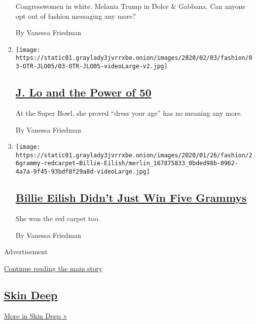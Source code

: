 \begin{enumerate}
  Congresswomen in white. Melania Trump in Dolce \& Gabbana. Can anyone
  opt out of fashion messaging any more?

  By Vanessa Friedman
\item
  \texttt{[image: https://static01.graylady3jvrrxbe.onion/images/2020/02/03/fashion/03-OTR-JLO05/03-OTR-JLO05-videoLarge-v2.jpg]}

  \hypertarget{j-lo-and-the-power-of-50}{%
  \subsection{\texorpdfstring{\href{/2020/02/03/style/jennifer-lopez-super-bowl.html}{J.
  Lo and the Power of
  50}}{J. Lo and the Power of 50}}\label{j-lo-and-the-power-of-50}}

  At the Super Bowl, she proved ``dress your age'' has no meaning any
  more.

  By Vanessa Friedman
\item
  \texttt{[image: https://static01.graylady3jvrrxbe.onion/images/2020/01/26/fashion/26grammy-redcarpet--Billie-Eilish/merlin\_167875833\_0bded98b-0962-4a7a-9f45-93bdf8f29a8d-videoLarge.jpg]}

  \hypertarget{billie-eilish-didnt-just-win-five-grammys}{%
  \subsection{\texorpdfstring{\href{/2020/01/27/fashion/billie-eilish-grammys.html}{Billie
  Eilish Didn't Just Win Five
  Grammys}}{Billie Eilish Didn't Just Win Five Grammys}}\label{billie-eilish-didnt-just-win-five-grammys}}

  She won the red carpet too.

  By Vanessa Friedman
\end{enumerate}

Advertisement

\protect\hyperlink{after-mid5}{Continue reading the main story}

\hypertarget{skin-deep}{%
\subsection{\texorpdfstring{\href{/column/skin-deep}{Skin
Deep}}{Skin Deep}}\label{skin-deep}}

\href{/column/skin-deep}{More in Skin Deep »}


